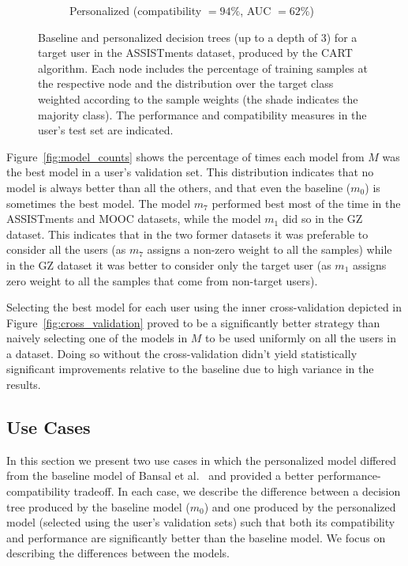 \documentclass[letterpaper]{article} %
\theoremstyle{definition}
\begin{document}
\begin{figure}[t]
\begin{subfigure}[b]{.6\textwidth}
\caption{Personalized (compatibility $=94\%$, AUC $=62\%$)}
\label{fig:assistments_personalized}
\end{subfigure}
\caption{Baseline and personalized decision trees (up to a depth of 3) for a target user in the ASSISTments dataset,  produced by the CART algorithm.  Each node includes  the percentage of training samples at the respective node and the distribution over the target class weighted according to the sample weights (the shade indicates the majority class). The performance and compatibility measures in the user's test set are indicated.}
\label{fig:user_case_assistments}
\end{figure}

Figure~\ref{fig:model_counts} shows the percentage of times each model from $M$ was the best model in a user's validation set. This distribution indicates that no model is always better than all the others, and that even the baseline ($m_0$) is sometimes the best model.
The model $m_7$ performed best most of the time in the ASSISTments and MOOC datasets, while the model $m_1$ did so in the GZ dataset. This indicates that in the two former datasets it was preferable to consider all the users (as $m_7$ assigns a non-zero weight to all the samples) while in the GZ dataset it was better to consider only the target user (as $m_1$ assigns zero weight to all the samples that come from non-target users).

Selecting the best model for each user using the inner cross-validation depicted in Figure~\ref{fig:cross_validation} proved to be a significantly better strategy than naively selecting one of the models in $M$ to be used uniformly on all the users in a dataset. Doing so without the cross-validation didn't yield statistically significant improvements relative to the baseline due to high variance in the results.

\subsection{Use Cases}
\label{sec:user_cases}
In this section we present two use cases in which the personalized model differed from the baseline model of Bansal et al.~ and provided a better performance-compatibility tradeoff.
In each case, we describe the difference between a decision tree produced by the baseline model ($m_0$) and one produced by the personalized model (selected using the user's validation sets) such that both its compatibility and performance are significantly better than the baseline model.
We focus on describing the differences between the models.
\end{document}
